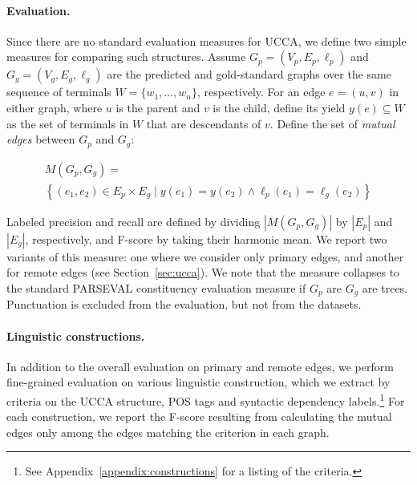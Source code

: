 \documentclass[11pt,a4paper]{article}
\newcommand{\secref}[1]{Section~\ref{#1}}
\begin{document}
\paragraph{Evaluation.}
Since there are no standard evaluation measures for UCCA, we define
two simple measures for comparing such structures.
Assume $G_p=(V_p,E_p,\ell_p)$ and $G_g=(V_g,E_g,\ell_g)$
are the predicted and gold-standard graphs over the same
sequence of terminals $W = \{w_1,\ldots,w_n\}$, respectively.
For an edge $e=(u,v)$ in either graph,
where $u$ is the parent and $v$ is the child, define its yield $y(e) \subseteq W$ as the
set of terminals in $W$ that are descendants of $v$.
Define the set of \textit{mutual edges} between $G_p$ and $G_g$:

\vspace{-.6cm}

{\small
\begin{multline*}
    M(G_p,G_g) = \\
    \left\{(e_1,e_2) \in E_p \times E_g \;|\;
    y(e_1) = y(e_2) \wedge \ell_p(e_1)=\ell_g(e_2)\right\}
\end{multline*}
}

\vspace{-.6cm}

Labeled precision and recall are defined by dividing $|M(G_p,G_g)|$ by $|E_p|$ and $|E_g|$, respectively,
and F-score by taking their harmonic mean.
We report two variants of this measure: one where we consider only primary edges,
and another for remote edges (see \secref{sec:ucca}).
We note that the measure collapses to the standard
PARSEVAL constituency evaluation measure if $G_p$ are $G_g$ are trees.
Punctuation is excluded from the evaluation, but not from the datasets.

\paragraph{Linguistic constructions.}

In addition to the overall evaluation on primary and remote edges,
we perform fine-grained evaluation on various linguistic construction,
which we extract by criteria on the UCCA structure, POS tags and syntactic
dependency labels.\footnote{See Appendix~\ref{appendix:constructions}
for a listing of the criteria.}
For each construction, we report the F-score resulting from calculating the
mutual edges only among the edges matching the criterion in each graph.
\end{document}
